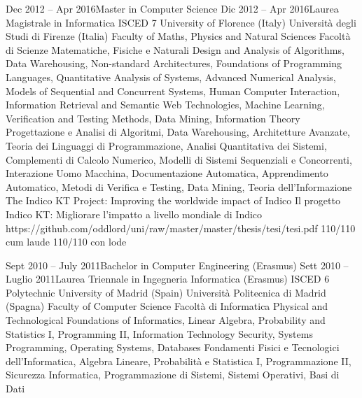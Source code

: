 {    \school
    {Dec 2012 -- Apr 2016}{Master in Computer Science}
    {Dic 2012 -- Apr 2016}{Laurea Magistrale in Informatica}
    {ISCED 7}
      \schoolLocation
        {University of Florence (Italy)}
        {Università degli Studi di Firenze (Italia)}
      \schoolFaculty
        {Faculty of Maths, Physics and Natural Sciences}
        {Facoltà di Scienze Matematiche, Fisiche e Naturali}
      \courses
        {Design and Analysis of Algorithms, Data Warehousing, Non-standard Architectures, Foundations of Programming Languages, Quantitative Analysis of Systems, Advanced Numerical Analysis, Models of Sequential and Concurrent Systems, Human Computer Interaction, Information Retrieval and Semantic Web Technologies, Machine Learning, Verification and Testing Methods, Data Mining, Information Theory}
        {Progettazione e Analisi di Algoritmi, Data Warehousing, Architetture Avanzate, Teoria dei Linguaggi di Programmazione, Analisi Quantitativa dei Sistemi, Complementi di Calcolo Numerico, Modelli di Sistemi Sequenziali e Concorrenti, Interazione Uomo Macchina, Documentazione Automatica, Apprendimento Automatico, Metodi di Verifica e Testing, Data Mining, Teoria dell'Informazione}
      \thesisURL
        {The Indico KT Project: Improving the worldwide impact of Indico}
        {Il progetto Indico KT: Migliorare l'impatto a livello mondiale di Indico}
        {https://github.com/oddlord/uni/raw/master/master/thesis/tesi/tesi.pdf}
      \finalRank
        {110/110 cum laude}
        {110/110 con lode}
    
    \school
    {Sept 2010 -- July 2011}{Bachelor in Computer Engineering (Erasmus)}
    {Sett 2010 -- Luglio 2011}{Laurea Triennale in Ingegneria Informatica (Erasmus)}
    {ISCED 6}
      \schoolLocation
        {Polytechnic University of Madrid (Spain)}
        {Università Politecnica di Madrid (Spagna)}
      \schoolFaculty
        {Faculty of Computer Science}
        {Facoltà di Informatica}
      \courses
        {Physical and Technological Foundations of Informatics, Linear Algebra, Probability and Statistics I, Programming II, Information Technology Security, Systems Programming, Operating Systems, Databases}
        {Fondamenti Fisici e Tecnologici dell'Informatica, Algebra Lineare, Probabilità e Statistica I, Programmazione II, Sicurezza Informatica, Programmazione di Sistemi, Sistemi Operativi, Basi di Dati}
      
}
